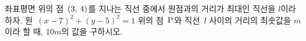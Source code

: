 좌표평면 위의 점~$(3,\mkern3mu 4)$를 지나는 직선 중에서 원점과의 거리가 최대인 직선을 $l$이라 하자. 원~$(x-7)^2+(y-5)^2=1$ 위의 점~$\mathrm{P}$와 직선~$l$ 사이의 거리의 최솟값을 $m$이라 할 때, $10m$의 값을 구하시오.
